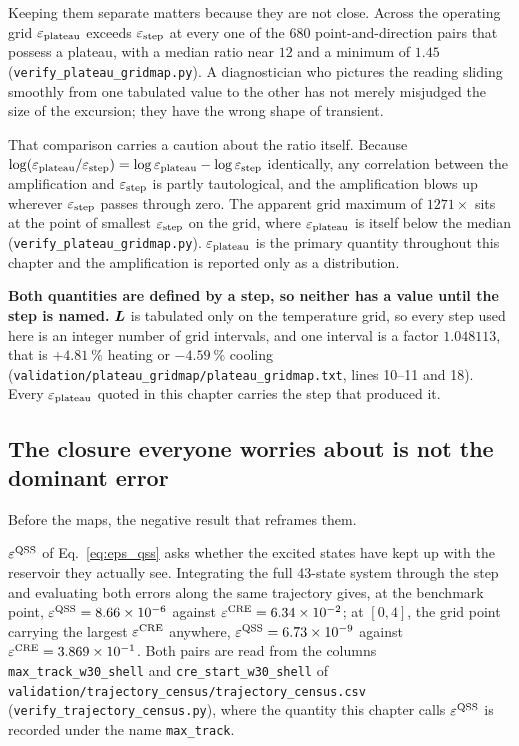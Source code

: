 Keeping them separate matters because they are not close. Across the operating
grid $\varepsilon_{\mathrm{plateau}}$ exceeds $\varepsilon_{\mathrm{step}}$ at every one of the 680 point-and-direction
pairs that possess a plateau, with a median ratio near $12$ and a minimum of
$1.45$ (\texttt{verify\_plateau\_gridmap.py}). A diagnostician who pictures the
reading sliding smoothly from one tabulated value to the other has not merely
misjudged the size of the excursion; they have the wrong shape of transient.

That comparison carries a caution about the ratio itself. Because
$\log(\varepsilon_{\mathrm{plateau}}/\varepsilon_{\mathrm{step}}) = \log\varepsilon_{\mathrm{plateau}} - \log\varepsilon_{\mathrm{step}}$ identically, any
correlation between the amplification and $\varepsilon_{\mathrm{step}}$ is partly tautological,
and the amplification blows up wherever $\varepsilon_{\mathrm{step}}$ passes through zero. The
apparent grid maximum of $1271\times$ sits at the point of smallest $\varepsilon_{\mathrm{step}}$
on the grid, where $\varepsilon_{\mathrm{plateau}}$ is itself below the median
(\texttt{verify\_plateau\_gridmap.py}). $\varepsilon_{\mathrm{plateau}}$ is the primary quantity
throughout this chapter and the amplification is reported only as a
distribution.

\textbf{Both quantities are defined by a step, so neither has a value until the
step is named.} $\bm{L}$ is tabulated only on the temperature grid, so every
step used here is an integer number of grid intervals, and one interval is a
factor $1.048113$, that is $+\SI{4.81}{\percent}$ heating or
$-\SI{4.59}{\percent}$ cooling
(\texttt{validation/plateau\_gridmap/plateau\_gridmap.txt}, lines 10--11 and
18). Every $\varepsilon_{\mathrm{plateau}}$ quoted in this chapter carries the step that produced it.

\subsection{The closure everyone worries about is not the dominant error}
\label{sec:qss_is_exact}

Before the maps, the negative result that reframes them.

$\varepsilon^{\mathrm{QSS}}$ of Eq.~\eqref{eq:eps_qss} asks whether the excited states have kept up
with the reservoir they actually see. Integrating the full 43-state system
through the step and evaluating both errors along the same trajectory gives, at
the benchmark point, $\varepsilon^{\mathrm{QSS}} = 8.66\times10^{-6}$ against
$\varepsilon^{\mathrm{CRE}} = 6.34\times10^{-2}$; at $[0,4]$, the grid point carrying the largest
$\varepsilon^{\mathrm{CRE}}$ anywhere, $\varepsilon^{\mathrm{QSS}} = 6.73\times10^{-9}$ against
$\varepsilon^{\mathrm{CRE}} = 3.869\times10^{-1}$. Both pairs are read from the columns
\texttt{max\_track\_w30\_shell} and \texttt{cre\_start\_w30\_shell} of
\texttt{validation/trajectory\_census/trajectory\_census.csv}
(\texttt{verify\_trajectory\_census.py}), where the quantity this chapter calls
$\varepsilon^{\mathrm{QSS}}$ is recorded under the name \texttt{max\_track}.

